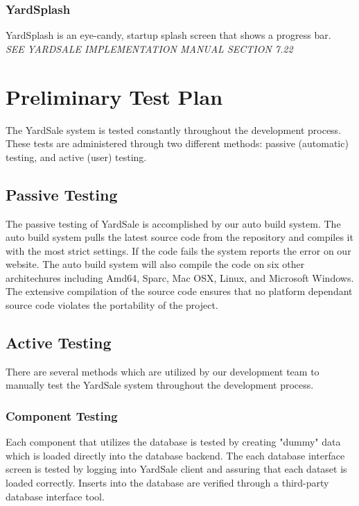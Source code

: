 \documentclass{report}
\begin{document}
        \subsection{YardSplash}
        YardSplash is an eye-candy, startup splash screen that shows a
        progress bar.\\
        {\sl SEE YARDSALE IMPLEMENTATION MANUAL SECTION 7.22}

\chapter{Preliminary Test Plan}
The YardSale system is tested constantly throughout the
development process.  These tests are administered through two
different methods: passive (automatic) testing, and active (user)
testing.

    \section{Passive Testing}

    The passive testing of YardSale is accomplished by our auto build system.  The auto build system pulls the latest source
    code from the repository and compiles it with the most strict settings.  If the code fails the system reports the error
    on our website.  The auto build system will also compile the code on six other architechures including Amd64, Sparc, Mac OSX,
    Linux, and Microsoft Windows.  The extensive compilation of the source code ensures that no platform dependant source code
    violates the portability of the project.

    \section{Active Testing}
    There are several methods which are utilized by our
    development team to manually test the YardSale system
    throughout the development process.
        \subsection{Component Testing}
	Each component that utilizes the database is tested by creating "dummy" data which is loaded directly into the database backend.  The each database interface screen is tested by logging into YardSale client and assuring that each dataset is loaded correctly.  Inserts into the database are verified through a third-party database interface tool.
\end{document}
